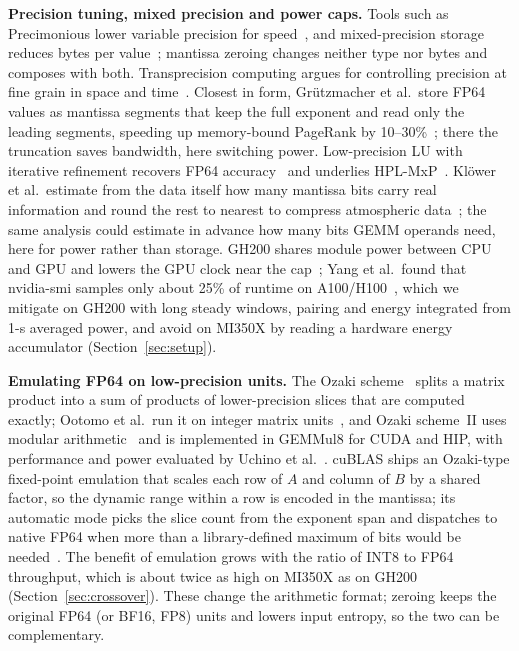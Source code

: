 \documentclass[conference]{IEEEtran}
\newcommand{\pct}{\%}
\begin{document}
\textbf{Precision tuning, mixed precision and power caps.} Tools such as Precimonious lower variable precision for
speed~\cite{RubioGonzalez2013}, and mixed-precision storage reduces bytes per value~\cite{Higham2022}; mantissa
zeroing changes neither type nor bytes and composes with both. Transprecision computing argues for controlling
precision at fine grain in space and time~\cite{Malossi2018}. Closest in form, Grützmacher et al.\ store FP64 values
as mantissa segments that keep the full exponent and read only the leading segments, speeding up memory-bound
PageRank by 10--30\pct~\cite{Grutzmacher2020}; there the truncation saves bandwidth, here switching power.
Low-precision LU with iterative refinement recovers FP64 accuracy~\cite{Haidar2018} and underlies
HPL-MxP~\cite{Dongarra2025}. Klöwer et al.\ estimate from the data itself how many mantissa bits carry real
information and round the rest to nearest to compress atmospheric data~\cite{Klower2021}; the same analysis could
estimate in advance how many bits GEMM operands need, here for power rather than storage. GH200 shares module power
between CPU and GPU and lowers the GPU clock near the cap~\cite{Patrou2025}; Yang et al.\ found that nvidia-smi
samples only about 25\pct{} of runtime on A100/H100~\cite{Yang2024}, which we mitigate on GH200 with long steady
windows, pairing and energy integrated from 1-s averaged power, and avoid on MI350X by reading a hardware energy
accumulator (Section~\ref{sec:setup}).

\textbf{Emulating FP64 on low-precision units.} The Ozaki scheme~\cite{Ozaki2012} splits a matrix product into a sum
of products of lower-precision slices that are computed exactly; Ootomo et al.\ run it on integer matrix
units~\cite{Ootomo2024}, and Ozaki scheme~II uses modular arithmetic~\cite{Ozaki2025} and is implemented in GEMMul8
for CUDA and HIP, with performance and power evaluated by Uchino et al.~\cite{Uchino2025}. cuBLAS ships an
Ozaki-type fixed-point emulation that scales each row of $A$ and column of $B$ by a shared factor, so the dynamic
range within a row is encoded in the mantissa; its automatic mode picks the slice count from the exponent span and
dispatches to native FP64 when more than a library-defined maximum of bits would be needed~\cite{cuBLASEmu,Schwarz2026}.
The benefit of emulation grows with the ratio of INT8 to FP64 throughput, which is about twice as high on MI350X as on
GH200 (Section~\ref{sec:crossover}). These change the arithmetic format; zeroing keeps the original FP64 (or BF16, FP8)
units and lowers input entropy, so the two can be complementary.
\end{document}
